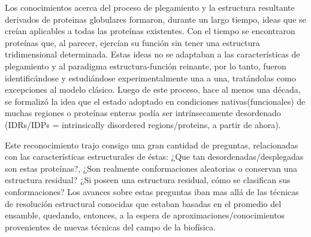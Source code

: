 Los conocimientos acerca del proceso de plegamiento y la estructura resultante derivados de proteinas globulares formaron, durante un largo tiempo, ideas que se creían aplicables a todas las proteínas existentes.
Con el tiempo se encontraron proteínas que, al parecer, ejercían su función sin tener una estructura tridimensional determinada. 
Estas ideas no se adaptaban a las características de plegamiento y al paradigma estructura-función reinante, por lo tanto, fueron identificándose 
y estudiándose experimentalmente una a una, tratándolas como excepciones al modelo clásico.
Luego de este proceso, hace al menos una década, se formalizó la idea que el estado adoptado en condiciones nativas(funcionales) de muchas regiones o proteínas enteras podía ser intrínsecamente desordenado
(IDRs/IDPs = intrinsically disordered regions/proteins, a partir de ahora). 



Este reconocimiento trajo consigo una gran cantidad de preguntas, relacionadas con las características estructurales de éstas:
¿Que tan desordenadas/desplegadas son estas proteínas?, ¿Son realmente conformaciones aleatorias o conservan una estructura residual?
¿Si poseen una estructura residual, cómo se clasifican sus conformaciones?
Los avances sobre estas preguntas iban mas allá de las técnicas de resolución estructural conocidas que estaban basadas en el promedio del ensamble, quedando, entonces,
a la espera de aproximaciones/conocimientos provenientes de nuevas técnicas del campo de la biofísica\cite{eliezer2009biophysical}.




